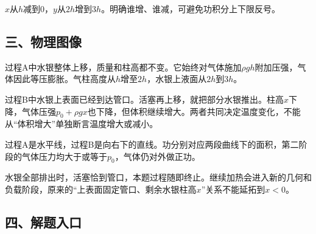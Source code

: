 \documentclass[12pt,a4paper,fontset=fandol]{ctexart}
\begin{document}
\(x\)从\(h\)减到0，\(y\)从\(2h\)增到\(3h\)。明确谁增、谁减，可避免功积分上下限反号。

\subsection{三、物理图像}\label{ux4e09ux7269ux7406ux56feux50cf-1}

过程A中水银整体上移，质量和柱高都不变。它始终对气体施加\(\rho gh\)附加压强，气体因此等压膨胀。气柱高度从\(h\)增至\(2h\)，水银上液面从\(2h\)到\(3h\)。

过程B中水银上表面已经到达管口。活塞再上移，就把部分水银推出。柱高\(x\)下降，气体压强\(p_0+\rho gx\)也下降，但体积继续增大。两者共同决定温度变化，不能从``体积增大''单独断言温度增大或减小。

\begin{center}
\begin{minipage}{\linewidth}
\centering\begingroup{}
\ifdim\wd\diagrambox>.88\linewidth
\sbox{\diagrambox}{\resizebox{.88\linewidth}{!}{\usebox{\diagrambox}}}\fi
\ifdim\ht\diagrambox>.38\textheight
\resizebox{!}{.38\textheight}{\usebox{\diagrambox}}
\else\usebox{\diagrambox}\fi
\par{}\endgroup\end{minipage}\end{center}

过程A是水平线，过程B是向右下的直线。功分别对应两段曲线下的面积，第二阶段的气体压力均大于或等于\(p_0\)，气体仍对外做正功。

水银全部排出时，活塞恰到管口，本题过程随即终止。继续加热会进入新的几何和负载阶段，原来的``上表面固定管口、剩余水银柱高\(x\)''关系不能延拓到\(x<0\)。

\subsection{四、解题入口}\label{ux56dbux89e3ux9898ux5165ux53e3-1}
\end{document}
